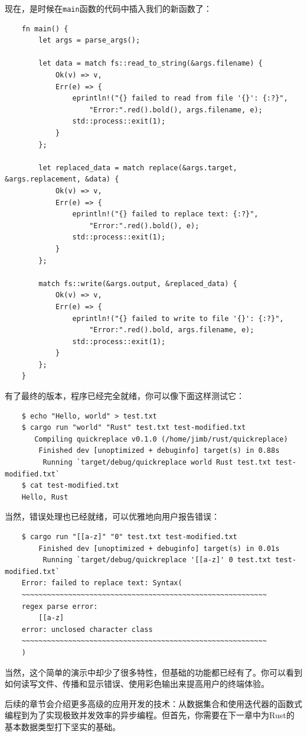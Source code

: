 现在，是时候在\texttt{main}函数的代码中插入我们的新函数了：
\begin{verbatim}
    fn main() {
        let args = parse_args();

        let data = match fs::read_to_string(&args.filename) {
            Ok(v) => v,
            Err(e) => {
                eprintln!("{} failed to read from file '{}': {:?}",
                    "Error:".red().bold(), args.filename, e);
                std::process::exit(1);
            }
        };

        let replaced_data = match replace(&args.target, &args.replacement, &data) {
            Ok(v) => v,
            Err(e) => {
                eprintln!("{} failed to replace text: {:?}",
                    "Error:".red().bold(), e);
                std::process::exit(1);
            }
        };

        match fs::write(&args.output, &replaced_data) {
            Ok(v) => v,
            Err(e) => {
                eprintln!("{} failed to write to file '{}': {:?}",
                    "Error:".red().bold, args.filename, e);
                std::process::exit(1);
            }
        };
    }
\end{verbatim}

有了最终的版本，程序已经完全就绪，你可以像下面这样测试它：
\begin{verbatim}
    $ echo "Hello, world" > test.txt
    $ cargo run "world" "Rust" test.txt test-modified.txt
       Compiling quickreplace v0.1.0 (/home/jimb/rust/quickreplace)
        Finished dev [unoptimized + debuginfo] target(s) in 0.88s
         Running `target/debug/quickreplace world Rust test.txt test-modified.txt`
    $ cat test-modified.txt
    Hello, Rust
\end{verbatim}

当然，错误处理也已经就绪，可以优雅地向用户报告错误：
\begin{verbatim}
    $ cargo run "[[a-z]" "0" test.txt test-modified.txt
        Finished dev [unoptimized + debuginfo] target(s) in 0.01s 
         Running `target/debug/quickreplace '[[a-z]' 0 test.txt test-modified.txt`
    Error: failed to replace text: Syntax(
    ~~~~~~~~~~~~~~~~~~~~~~~~~~~~~~~~~~~~~~~~~~~~~~~~~~~~~~~~~~
    regex parse error:
        [[a-z]
    error: unclosed character class
    ~~~~~~~~~~~~~~~~~~~~~~~~~~~~~~~~~~~~~~~~~~~~~~~~~~~~~~~~~~
    )
\end{verbatim}

当然，这个简单的演示中却少了很多特性，但基础的功能都已经有了。你可以看到如何读写文件、传播和显示错误、使用彩色输出来提高用户的终端体验。

后续的章节会介绍更多高级的应用开发的技术：从数据集合和使用迭代器的函数式编程到为了实现极致并发效率的异步编程。但首先，你需要在下一章中为Rust的基本数据类型打下坚实的基础。
